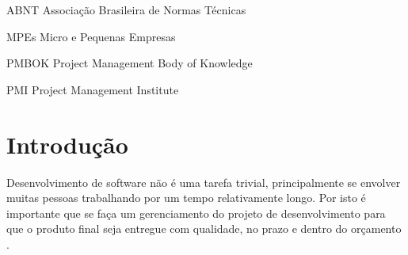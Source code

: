 \documentclass[
    12pt,               %
    openright,          %
    twoside,            %
    a4paper,            %
    chapter=TITLE,     %
    english,            %
    spanish,            %
    portuguese              %
    ]{abntex2}
\begin{document}




\label{lista ilustrações}
  \listoffigures*
  \cleardoublepage


\label{lista tabelas}
  \listoftables*
  \cleardoublepage


\label{lista siglas}
\begin{siglas}
	\item[ABNT] Associação Brasileira de Normas Técnicas
	\item[MPEs] Micro e Pequenas Empresas
	\item[PMBOK] Project Management Body of Knowledge
	\item[PMI] Project Management Institute

\end{siglas}


\tableofcontents

\textual


\chapter{Introdução}

Desenvolvimento de software não é uma tarefa trivial, principalmente se envolver muitas pessoas trabalhando por um tempo relativamente longo. Por isto é importante que se faça um gerenciamento do projeto de desenvolvimento para que o produto final seja entregue com qualidade, no prazo e dentro do orçamento \cite[p.~555]{pressman2011}.
\end{document}
